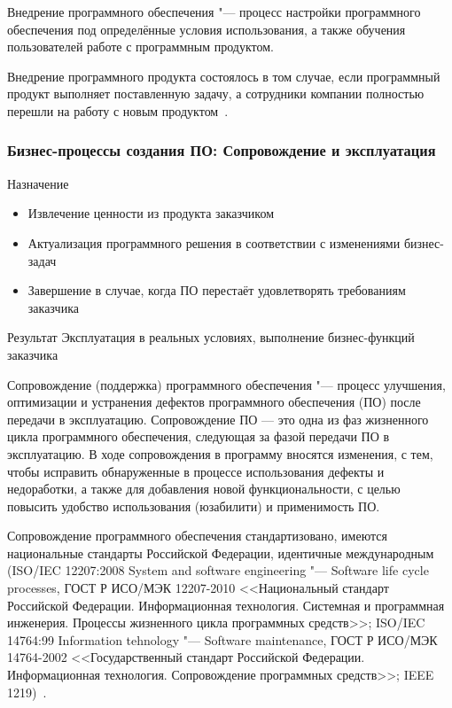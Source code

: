 \documentclass{../industrial-development}
\begin{document}
\lecturenotes
	
Внедрение программного обеспечения "--- процесс настройки программного обеспечения под определённые условия использования, а также обучения пользователей работе с программным продуктом.

Внедрение программного продукта состоялось в том случае, если программный продукт выполняет поставленную задачу, а сотрудники компании полностью перешли на работу с новым продуктом~\cite{Habr3}.	


\begin{frame} \frametitle{Бизнес-процессы создания ПО: Сопровождение и эксплуатация}
	\begin{block}{Назначение}
		\begin{itemize}
			\item Извлечение ценности из продукта заказчиком
			\item Актуализация программного решения в соответствии с изменениями бизнес-задач
			\item Завершение в случае, когда ПО перестаёт удовлетворять требованиям заказчика
		\end{itemize}
	\end{block}
	\begin{block}{Результат}
		Эксплуатация в реальных условиях, выполнение бизнес-функций заказчика
	\end{block}
\end{frame}

\lecturenotes

Сопровождение (поддержка) программного обеспечения "--- процесс улучшения, оптимизации и устранения дефектов программного обеспечения (ПО) после передачи в эксплуатацию. Сопровождение ПО — это одна из фаз жизненного цикла программного обеспечения, следующая за фазой передачи ПО в эксплуатацию. В ходе сопровождения в программу вносятся изменения, с тем, чтобы исправить обнаруженные в процессе использования дефекты и недоработки, а также для добавления новой функциональности, с целью повысить удобство использования (юзабилити) и применимость ПО.

Сопровождение программного обеспечения стандартизовано, имеются национальные стандарты Российской Федерации, идентичные международным (ISO/IEC 12207:2008 System and software engineering "--- Software life cycle processes, ГОСТ Р ИСО/МЭК 12207-2010 <<Национальный стандарт Российской Федерации. Информационная технология. Системная и программная инженерия. Процессы жизненного цикла программных средств>>; ISO/IEC 14764:99 Information tehnology "--- Software maintenance, ГОСТ Р ИСО/МЭК 14764-2002 <<Государственный стандарт Российской Федерации. Информационная технология. Сопровождение программных средств>>; IEEE 1219)~\cite{Wiki1}.
\end{document}
